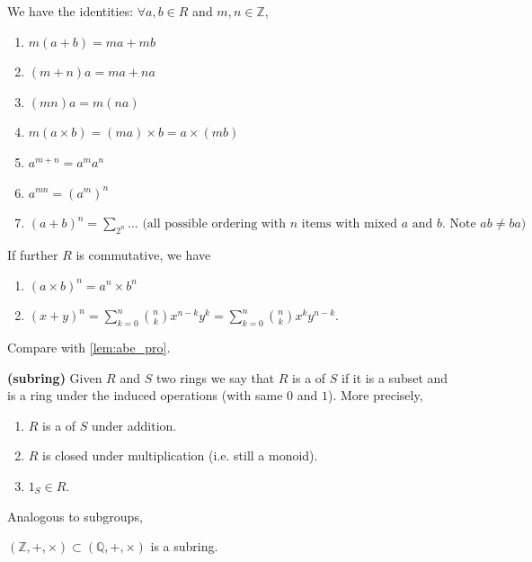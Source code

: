 \documentclass{article}
\newcommand{\bfs}[1]{\textbf{({#1}) }}
\begin{document}
\begin{lema}\label{lem:odnndsaff}
  We have the identities: $\forall a, b \in R$ and $m, n \in \mathbb{Z}$,
\begin{enumerate}
    \item $m(a+b)=m a+m b$
    \item $(m+n) a=m a+n a$
    \item $(m n) a=m(n a)$
    \item $m(a\times b)=(ma)\times b=a\times (mb)$
    \item $a^{m+n}=a^ma^n$
    \item $a^{mn} = (a^m)^n$
    \item $(a+b)^n= \sum_{2^n} ...\text{ (all possible ordering with $n$ items with mixed $a$ and $b$. Note $ab\ne ba$)}$
\end{enumerate}
If further $R$ is commutative, we have
\begin{enumerate}
\item $(a\times b)^n= a^n\times b^n$ 
    \item $ (x+y)^{n}=\sum _{k=0}^{n}{n \choose k}x^{n-k}y^{k}=\sum _{k=0}^{n}{n \choose k}x^{k}y^{n-k}.$
\end{enumerate}
\end{lema}
\begin{rema}
Compare with \cref{lem:abe_pro}. %
\end{rema}
\begin{defa}\bfs{subring}
 Given $R$ and $S$ two rings we say that $R$ is a  of $S$ if it is a subset and is a ring under the induced operations (with same $0$ and $1$). More precisely,
 \begin{enumerate}
     \item  $R$ is a  of $S$ under addition.
     \item $R$ is closed under multiplication (i.e. still a monoid).
     \item $1_{S} \in R$. 
 \end{enumerate}
\end{defa}
\begin{lema}
Analogous to subgroups, 
\end{lema}
\begin{exma}
 $(\mathbb{Z},+, \times) \subset(\mathbb{Q},+, \times)$ is a subring.
\end{exma}
\end{document}
